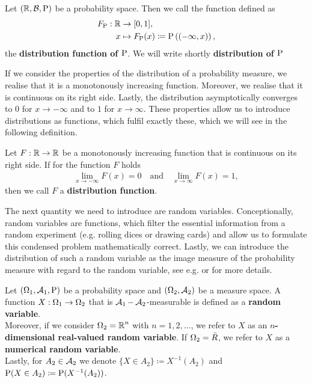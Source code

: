 \begin{definition}\label{def:prob_distr_1}
Let $(\operatorname{\mathbb{R}}, \operatorname{\mathcal{B}}, \operatorname{\text{P}})$ be a probability space. Then we call the function defined as
\begin{align*}
F_{\operatorname{\text{P}}}: \operatorname{\mathbb{R}} &\to [0,1 ],\\
x &\mapsto F_{\operatorname{\text{P}}} (x) \coloneqq \operatorname{\text{P}} \left((-\infty, x )\right),
\end{align*}
the \textbf{distribution function of $\operatorname{\text{P}}$}. We will write shortly \textbf{distribution of $\operatorname{\text{P}}$}
\end{definition}

If we consider the properties of the distribution of a probability measure, we realise that it is a monotonously increasing function. Moreover, we realise that it is continuous on its right side. Lastly, the distribution asymptotically converges to $0$ for $x\to-\infty$ and to $1$ for $x\to\infty$. These properties allow us to introduce distributions as functions, which fulfil exactly these, which we will see in the following definition.

\begin{definition}\label{def:prob_distr_2}
Let $F:\operatorname{\mathbb{R}} \to \operatorname{\mathbb{R}}$ be a monotonously increasing function that is continuous on its right side. If for the function $F$ holds
\begin{align*}
\lim_{x\to -\infty} F(x) = 0 \quad \text{and} \quad \lim_{x\to \infty} F(x) = 1,
\end{align*}
then we call $F$ a \textbf{distribution function}.
\end{definition}

The next quantity we need to introduce are random variables. Conceptionally, random variables are functions, which filter the essential information from a random experiment (e.g. rolling dices or drawing cards) and allow us to formulate this condensed problem mathematically correct. Lastly, we can introduce the distribution of such a random variable as the image measure of the probability measure with regard to the random variable, see e.g. \cite[Definition~1.42]{meintrup2006stochastik} or \cite[Definition~1.102]{klenke2013probability} for more details.

\begin{definition}\label{def:rv}
Let $(\Omega_1, \operatorname{\mathcal{A}}_1, \operatorname{\text{P}})$ be a probability space and $(\Omega_2, \operatorname{\mathcal{A}}_2)$ be a measure space. A function $X: \Omega_1 \to \Omega_2$ that is $\operatorname{\mathcal{A}}_1-\operatorname{\mathcal{A}}_2$-measurable is defined as a \textbf{random variable}.\\
Moreover, if we consider $\Omega_2= \operatorname{\mathbb{R}}^n$ with $n=1,2,\ldots$, we refer to $X$ as an \textbf{$n$-dimensional real-valued random variable}. If $\Omega_2 = \bar{R}$, we refer to $X$ as a \textbf{numerical random variable}.\\
Lastly, for $A_2\in\operatorname{\mathcal{A}}_2$ we denote $\{X\in A_2\}\coloneqq X^{-1}(A_2)$ and $\operatorname{\text{P}}(X\in A_2) \coloneqq \operatorname{\text{P}}(X^{-1}(A_2))$.
\end{definition}

